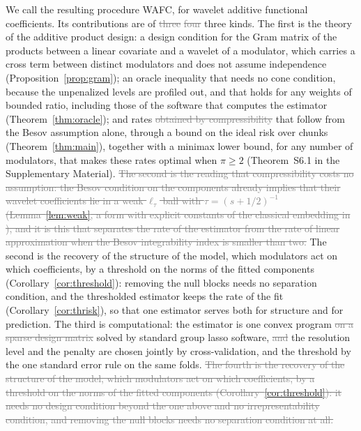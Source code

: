 \documentclass[12pt]{article} %
\theoremstyle{definition}
\theoremstyle{plain}
\begin{document}

We call the resulting procedure WAFC, for wavelet additive functional
coefficients. Its contributions are of \textcolor{gray}{\sout{three}} \textcolor{gray}{\sout{four}} \textcolor{colR1}{three} kinds. The first is the theory of
the additive product design: a design condition for the Gram matrix of the
products between a linear covariate and a wavelet of a modulator, which
carries a cross term between distinct modulators and does not assume
independence (Proposition~\ref{prop:gram}); an oracle inequality that needs no
cone condition, because the unpenalized levels are profiled out\textcolor{colR1}{, and
that holds for any weights of bounded ratio, including those of the software
that computes the estimator}
(Theorem~\ref{thm:oracle}); and rates \textcolor{gray}{\sout{obtained by compressibility}}
\textcolor{colR1}{that follow from the Besov assumption alone, through a bound on the
ideal risk over chunks}
(Theorem~\ref{thm:main})\textcolor{colR1}{, together with a minimax lower bound, for any number
of modulators, that makes these rates optimal when $\pi \ge 2$ (Theorem~S6.1 in
the Supplementary Material)}. \textcolor{gray}{\sout{The second is the reading that compressibility costs
no assumption: the Besov condition on the components already implies that
their wavelet coefficients lie in a weak $\ell_\tau$ ball with
$\tau = (s+1/2)^{-1}$ (Lemma~\mbox{\ref{lem:weak}}, a form with explicit constants
of the classical embedding in \mbox{\citealp[Proposition~9.15]{johnstone2019gaussian}}),
and it is this that separates the rate of the estimator from the rate of linear
approximation when the Besov integrability index is smaller than two.}}
\textcolor{colR1}{The second is the recovery of the structure of the model, which
modulators act on which coefficients, by a threshold on the norms of the
fitted components (Corollary~\ref{cor:threshold}): removing the null blocks
needs no separation condition, and the thresholded estimator keeps the rate of
the fit (Corollary~\ref{cor:thrisk}), so that one estimator serves both for
structure and for prediction.} The third is computational: the
estimator is one convex program \textcolor{gray}{\sout{on a sparse design matrix}} \textcolor{colR1}{solved by
standard group lasso software}, \textcolor{gray}{\sout{and}} the resolution
level and the penalty are chosen jointly \textcolor{colR1}{by cross-validation, and the
threshold by the one standard error rule on the same folds}.
\textcolor{gray}{\sout{The fourth is the recovery of the structure of the model, which
modulators act on which coefficients, by a threshold on the norms of the
fitted components (Corollary~\mbox{\ref{cor:threshold}}): it needs no design
condition beyond the one above and no irrepresentability condition, and
removing the null blocks needs no separation condition at all.}}
\end{document}
